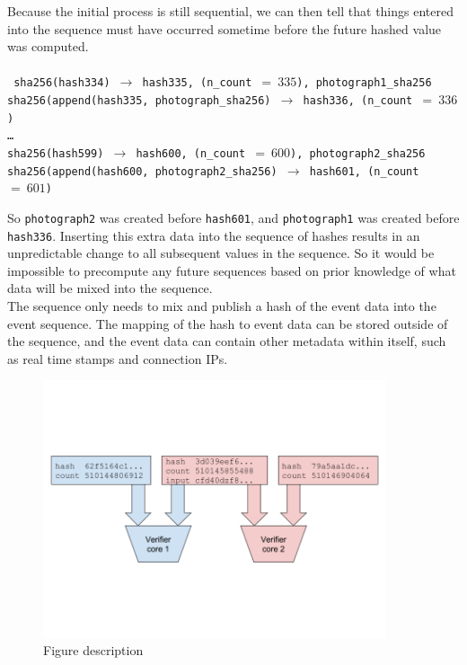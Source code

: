 \documentclass[12pt]{article}
\begin{document}
Because the initial process is still sequential, we can then tell that things entered into the sequence must have occurred sometime before the future hashed value was computed.\\\\\noindent
\texttt{
sha256(hash334) $\rightarrow$ hash335, (n\_count $=~335$), photograph1\_sha256\\
sha256(append(hash335, photograph\_sha256) $\rightarrow$ hash336,
(n\_count $=~336$)\\
\ldots\\
sha256(hash599) $\rightarrow$ hash600, (n\_count $=~600$), photograph2\_sha256
sha256(append(hash600, photograph2\_sha256) $\rightarrow$ hash601,
(n\_count $=~601$)\\
}

So \texttt{photograph2} was created before \texttt{hash601}, and
\texttt{photograph1} was created before \texttt{hash336}. Inserting this extra data into the sequence of hashes results in an unpredictable change to all subsequent values in the sequence. So it would be impossible to precompute any future sequences based on prior knowledge of what data will be mixed into the sequence.\\

The sequence only needs to mix and publish a hash of the event data into the event sequence. The mapping of the hash to event data can be stored outside of the sequence, and the event data can contain other metadata within itself, such as real time stamps and connection IPs.\\

\begin{figure}
  \begin{center}
    \centering
    \includegraphics[width=0.9\textwidth]{figures/fig_3.png}
    \caption[Fig 3]{Figure description \label{fig:poh_insert}}
  \end{center}
  \end{figure}
\end{document}
